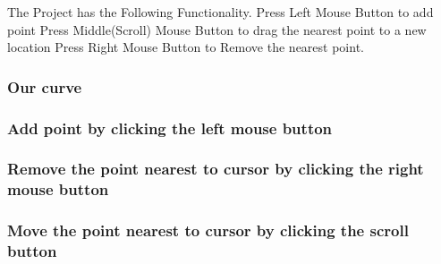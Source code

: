 The Project has the Following Functionality. Press Left Mouse Button to add point Press Middle(\+Scroll) Mouse Button to drag the nearest point to a new location Press Right Mouse Button to Remove the nearest point.

\subsubsection*{Our curve}



\subsubsection*{Add point by clicking the left mouse button}



\subsubsection*{Remove the point nearest to cursor by clicking the right mouse button}



\subsubsection*{Move the point nearest to cursor by clicking the scroll button}

 